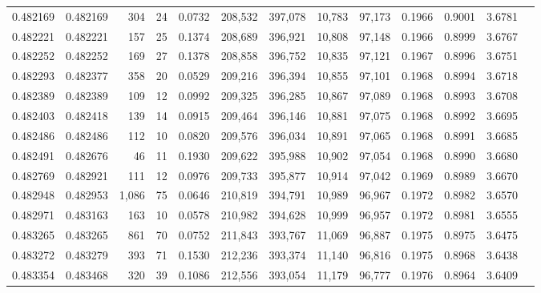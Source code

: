\begin{tabular}{rrrrrrrrrrrrr}
0.482169 & 0.482169 &   304 &    24 &                                     0.0732 & 208,532 & 397,078 &  10,783 &  97,173 & 0.1966 & 0.9001 & 3.6781 \\
0.482221 & 0.482221 &   157 &    25 &                                     0.1374 & 208,689 & 396,921 &  10,808 &  97,148 & 0.1966 & 0.8999 & 3.6767 \\
0.482252 & 0.482252 &   169 &    27 &                                     0.1378 & 208,858 & 396,752 &  10,835 &  97,121 & 0.1967 & 0.8996 & 3.6751 \\
0.482293 & 0.482377 &   358 &    20 &                                     0.0529 & 209,216 & 396,394 &  10,855 &  97,101 & 0.1968 & 0.8994 & 3.6718 \\
0.482389 & 0.482389 &   109 &    12 &                                     0.0992 & 209,325 & 396,285 &  10,867 &  97,089 & 0.1968 & 0.8993 & 3.6708 \\
0.482403 & 0.482418 &   139 &    14 &                                     0.0915 & 209,464 & 396,146 &  10,881 &  97,075 & 0.1968 & 0.8992 & 3.6695 \\
0.482486 & 0.482486 &   112 &    10 &                                     0.0820 & 209,576 & 396,034 &  10,891 &  97,065 & 0.1968 & 0.8991 & 3.6685 \\
0.482491 & 0.482676 &    46 &    11 &                                     0.1930 & 209,622 & 395,988 &  10,902 &  97,054 & 0.1968 & 0.8990 & 3.6680 \\
0.482769 & 0.482921 &   111 &    12 &                                     0.0976 & 209,733 & 395,877 &  10,914 &  97,042 & 0.1969 & 0.8989 & 3.6670 \\
0.482948 & 0.482953 & 1,086 &    75 &                                     0.0646 & 210,819 & 394,791 &  10,989 &  96,967 & 0.1972 & 0.8982 & 3.6570 \\
0.482971 & 0.483163 &   163 &    10 &                                     0.0578 & 210,982 & 394,628 &  10,999 &  96,957 & 0.1972 & 0.8981 & 3.6555 \\
0.483265 & 0.483265 &   861 &    70 &                                     0.0752 & 211,843 & 393,767 &  11,069 &  96,887 & 0.1975 & 0.8975 & 3.6475 \\
0.483272 & 0.483279 &   393 &    71 &                                     0.1530 & 212,236 & 393,374 &  11,140 &  96,816 & 0.1975 & 0.8968 & 3.6438 \\
0.483354 & 0.483468 &   320 &    39 &                                     0.1086 & 212,556 & 393,054 &  11,179 &  96,777 & 0.1976 & 0.8964 & 3.6409 \\

\end{tabular}

